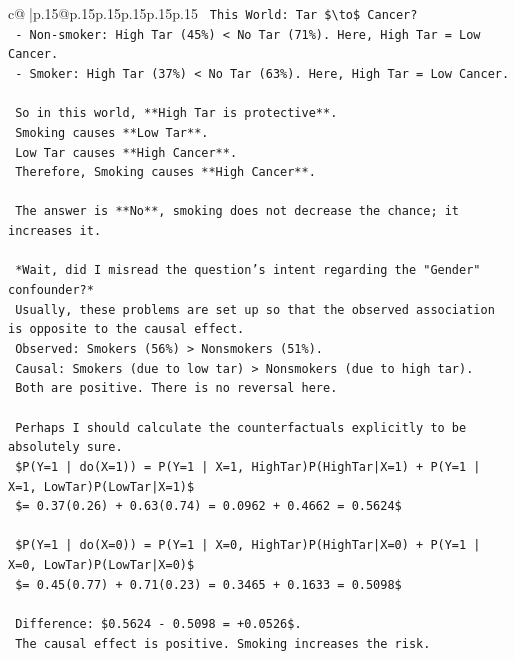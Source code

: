 \documentclass{article}
\begin{document}
{\begin{supertabular}{c@{$\;$}|p{.15\linewidth}@{}p{.15\linewidth}p{.15\linewidth}p{.15\linewidth}p{.15\linewidth}p{.15\linewidth}}
{{{\texttt{    This World: Tar \$\textbackslash{}to\$ Cancer?} \\
\texttt{    {-} Non{-}smoker: High Tar (45\%) < No Tar (71\%). Here, High Tar = Low Cancer.} \\
\texttt{    {-} Smoker: High Tar (37\%) < No Tar (63\%). Here, High Tar = Low Cancer.} \\
\\ 
\texttt{    So in this world, **High Tar is protective**.} \\
\texttt{    Smoking causes **Low Tar**.} \\
\texttt{    Low Tar causes **High Cancer**.} \\
\texttt{    Therefore, Smoking causes **High Cancer**.} \\
\\ 
\texttt{    The answer is **No**, smoking does not decrease the chance; it increases it.} \\
\\ 
\texttt{    *Wait, did I misread the question's intent regarding the "Gender" confounder?*} \\
\texttt{    Usually, these problems are set up so that the observed association is opposite to the causal effect.} \\
\texttt{    Observed: Smokers (56\%) > Nonsmokers (51\%).} \\
\texttt{    Causal: Smokers (due to low tar) > Nonsmokers (due to high tar).} \\
\texttt{    Both are positive. There is no reversal here.} \\
\\ 
\texttt{    Perhaps I should calculate the counterfactuals explicitly to be absolutely sure.} \\
\texttt{    \$P(Y=1 | do(X=1)) = P(Y=1 | X=1, HighTar)P(HighTar|X=1) + P(Y=1 | X=1, LowTar)P(LowTar|X=1)\$} \\
\texttt{    \$= 0.37(0.26) + 0.63(0.74) = 0.0962 + 0.4662 = 0.5624\$} \\
\\ 
\texttt{    \$P(Y=1 | do(X=0)) = P(Y=1 | X=0, HighTar)P(HighTar|X=0) + P(Y=1 | X=0, LowTar)P(LowTar|X=0)\$} \\
\texttt{    \$= 0.45(0.77) + 0.71(0.23) = 0.3465 + 0.1633 = 0.5098\$} \\
\\ 
\texttt{    Difference: \$0.5624 {-} 0.5098 = +0.0526\$.} \\
\texttt{    The causal effect is positive. Smoking increases the risk.} \\
}}}
\end{supertabular}}
\end{document}
